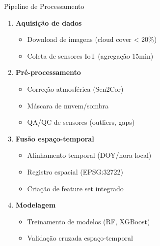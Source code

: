 \documentclass[aspectratio=169]{beamer}
\begin{document}
\begin{frame}{Pipeline de Processamento}
  \begin{enumerate}
    \item \textbf{Aquisição de dados}
      \begin{itemize}
        \item Download de imagens (cloud cover < 20\%)
        \item Coleta de sensores IoT (agregação 15min)
      \end{itemize}
    
    \item \textbf{Pré-processamento}
      \begin{itemize}
        \item Correção atmosférica (Sen2Cor)
        \item Máscara de nuvem/sombra
        \item QA/QC de sensores (outliers, gaps)
      \end{itemize}
    
    \item \textbf{Fusão espaço-temporal}
      \begin{itemize}
        \item Alinhamento temporal (DOY/hora local)
        \item Registro espacial (EPSG:32722)
        \item Criação de feature set integrado
      \end{itemize}
    
    \item \textbf{Modelagem}
      \begin{itemize}
        \item Treinamento de modelos (RF, XGBoost)
        \item Validação cruzada espaço-temporal
      \end{itemize}
  \end{enumerate}
\end{frame}
\end{document}
